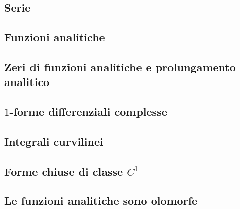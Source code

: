 \documentclass{article}
\begin{document}
\subsection{Serie}


\subsection{Funzioni analitiche}


\subsection{Zeri di funzioni analitiche e prolungamento analitico}


\subsection{$1$-forme differenziali complesse}


\subsection{Integrali curvilinei}


\subsection{Forme chiuse di classe $C^1$}


\subsection{Le funzioni analitiche sono olomorfe}

\end{document}
